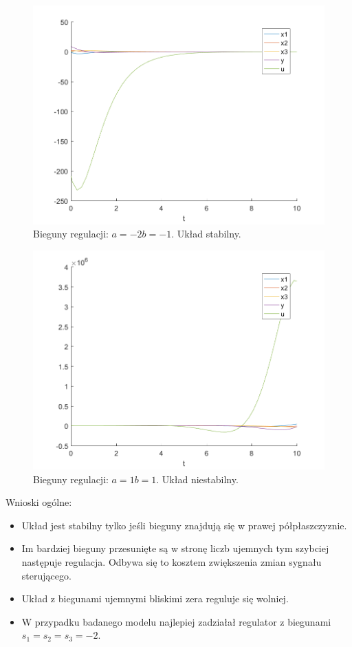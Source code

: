 \documentclass{article}
\begin{document}
\begin{figure}[H]
\centering
\includegraphics[width=0.9\linewidth]{z6_-2,-1}
\caption{Bieguny regulacji: $a = -2 b = -1$. Układ stabilny.}
\label{fig:z6-21}
\end{figure}

\begin{figure}[H]
\centering
\includegraphics[width=0.9\linewidth]{z6_1,1}
\caption{Bieguny regulacji: $a = 1 b = 1$. Układ niestabilny.}
\label{fig:z611}
\end{figure}

Wnioski ogólne:
\begin{itemize}
\item Układ jest stabilny tylko jeśli bieguny znajdują się w prawej półpłaszczyznie.
\item Im bardziej bieguny przesunięte są w stronę liczb ujemnych tym szybciej następuje regulacja. Odbywa się to kosztem zwiększenia zmian sygnału sterującego.
\item Układ z biegunami ujemnymi bliskimi zera reguluje się wolniej.
\item W przypadku badanego modelu najlepiej zadziałał regulator z biegunami $s_1 = s_2 = s_3 = -2$.
\end{itemize}
\end{document}
